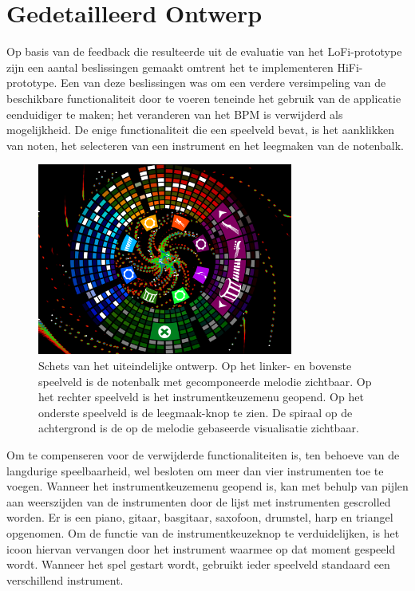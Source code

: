 \documentclass{acm}
\begin{document}
\section{Gedetailleerd Ontwerp}
\label{sec_detail}
Op basis van de feedback die resulteerde uit de evaluatie van het LoFi-prototype zijn een aantal beslissingen gemaakt omtrent het te implementeren HiFi-prototype. Een van deze beslissingen was om een verdere versimpeling van de beschikbare functionaliteit door te voeren teneinde het gebruik van de applicatie eenduidiger te maken; het veranderen van het BPM is verwijderd als mogelijkheid. De enige functionaliteit die een speelveld bevat, is het aanklikken van noten, het selecteren van een instrument en het leegmaken van de notenbalk.

\begin{figure}
  \includegraphics[width=84mm]{img/muziektafel_v3}
  \caption{Schets van het uiteindelijke ontwerp. Op het linker- en bovenste speelveld is de notenbalk met gecomponeerde melodie zichtbaar. Op het rechter speelveld is het instrumentkeuzemenu geopend. Op het onderste speelveld is de leegmaak-knop te zien. De spiraal op de achtergrond is de op de melodie gebaseerde visualisatie zichtbaar.}
  \label{fig:muziektafel_v3}
\end{figure}

Om te compenseren voor de verwijderde functionaliteiten is, ten behoeve van de langdurige speelbaarheid, wel besloten om meer dan vier instrumenten toe te voegen. Wanneer het instrumentkeuzemenu geopend is, kan met behulp van pijlen aan weerszijden van de instrumenten door de lijst met instrumenten gescrolled worden. Er is een piano, gitaar, basgitaar, saxofoon, drumstel, harp en triangel opgenomen. Om de functie van de instrumentkeuzeknop te verduidelijken, is het icoon hiervan vervangen door het instrument waarmee op dat moment gespeeld wordt. Wanneer het spel gestart wordt, gebruikt ieder speelveld standaard een verschillend instrument.
\end{document}
